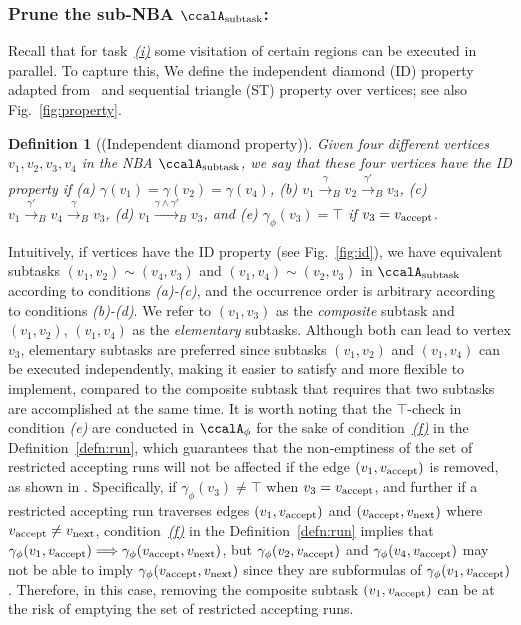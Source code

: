 \documentclass[Afour,sageh,times]{sagej}
\newtheorem{defn}[thm]{Definition}
\newcommand{\auto}[1]{\ccalA_{\textup{#1}}}
\newcommand{\autop}{\ccalA_{\phi}}
\newcommand{\vertex}[1]{v_{\textup{#1}}}
\newcommand{\simplies}{\DOTSB\Longrightarrow}
\begin{document}
  \subsubsection{Prune the sub-NBA \upshape $\auto{subtask}$:} \label{sub-NBA:2}
Recall that for task~\hyperref[task:i]{\it (i)}  some visitation of certain regions can be executed in parallel. To capture this, We define the independent diamond (ID) property adapted from~\cite{stefanescu2006automatic}  and sequential triangle (ST) property over vertices; see also Fig.~\ref{fig:property}.
\begin{defn}[(Independent diamond property)]\label{defn:id}
   Given four different vertices $v_1, v_2, v_3, v_4$ in the NBA $\auto{subtask}$, we say that these four vertices have the ID property if (a) $\gamma(v_1) = \gamma(v_2) = \gamma(v_4)$, (b) $v_1 \xrightarrow{\gamma}_B v_2 \xrightarrow{\gamma'}_B v_3$, (c) $v_1 \xrightarrow{\gamma'}_B v_4 \xrightarrow{\gamma}_B v_3$,  (d) $v_1 \xrightarrow{\gamma \wedge \gamma'}_B v_3$, and (e) $\gamma_{\phi}(v_3) = \top$ if $v_3 = \vertex{accept}$.
\end{defn}
Intuitively, if vertices have the ID property (see Fig.~\ref{fig:id}), we have equivalent subtasks $(v_1, v_2) \sim (v_4, v_3)$ and $(v_1, v_4) \sim (v_2, v_3)$ in $\auto{subtask}$ according to conditions {\it (a)-(c)}, and the occurrence order is arbitrary according to conditions {\it (b)-(d)}.  We refer to $(v_1, v_3)$ as the {\it composite} subtask and $(v_1, v_2)$, $(v_1, v_4)$ as the {\it elementary} subtasks.  Although both can lead to vertex $v_3$, elementary subtasks are preferred since subtasks $(v_1, v_2)$ and $(v_1, v_4)$ can be executed independently, making it easier to satisfy and more flexible to implement, compared to the composite subtask that requires that two subtasks are accomplished at the same time. It is worth noting that the $\top$-check in condition {\it (e)} are conducted in $\autop$ for the sake of condition~\hyperref[cond:f]{\it (f)} in the Definition~\ref{defn:run}, which guarantees that the non-emptiness of the set of restricted accepting runs will not be affected if the edge $(v_1, \vertex{accept})$ is removed,  as shown in . Specifically, if $\gamma_{\phi}(v_3) \ne \top$ when $v_3 = \vertex{accept}$, and further if a restricted accepting run traverses edges $(v_1, \vertex{accept})$ and $(\vertex{accept}, \vertex{next})$ where $\vertex{accept}\neq \vertex{next}$, condition~\hyperref[cond:f]{\it (f)} in the Definition~\ref{defn:run} implies  that $\gamma_{\phi}(v_1, \vertex{accept}) \simplies \gamma_{\phi}(\vertex{accept}, \vertex{next})$, but $\gamma_{\phi}(v_2, \vertex{accept})$ and $\gamma_{\phi}(v_4, \vertex{accept})$ may not be able to imply $\gamma_{\phi}(\vertex{accept}, \vertex{next})$ since they are subformulas of $\gamma_{\phi}(v_1, \vertex{accept})$. Therefore, in this case, removing the composite subtask $(v_1, \vertex{accept})$ can be at the risk of emptying the  set of restricted accepting runs.
\end{document}
